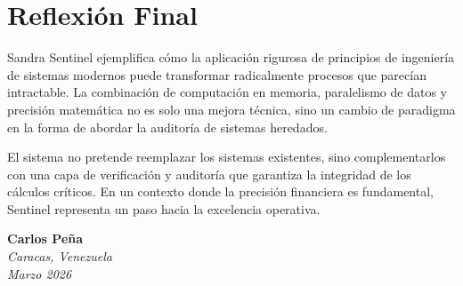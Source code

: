 \section{Reflexión Final}

\bigskip

Sandra Sentinel ejemplifica cómo la aplicación rigurosa de principios de ingeniería de sistemas modernos puede transformar radicalmente procesos que parecían intractable. La combinación de computación en memoria, paralelismo de datos y precisión matemática no es solo una mejora técnica, sino un cambio de paradigma en la forma de abordar la auditoría de sistemas heredados.

\bigskip

El sistema no pretende reemplazar los sistemas existentes, sino complementarlos con una capa de verificación y auditoría que garantiza la integridad de los cálculos críticos. En un contexto donde la precisión financiera es fundamental, Sentinel representa un paso hacia la excelencia operativa.

\bigskip

\begin{flushright}
    \textbf{Carlos Peña} \\
    \textit{Caracas, Venezuela} \\
    \textit{Marzo 2026}
\end{flushright}

\vfill
\newpage
